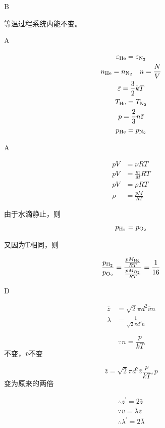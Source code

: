 \documentclass[b5paper,opensource]{./template/qyxf-book}
\begin{document}
B

\solve 等温过程系统内能不变。

A

\solve

\begin{gather*}
\varepsilon_{\ce{He}}=\varepsilon_{\ce{N2}}\\
n_{\ce{He}}=n_{\ce{N2}}\quad n=\frac{N}{V}\\
\bar{\varepsilon}=\frac{3}{2}kT\\
T_{\ce{He}}=T_{\ce{N2}}\\
p=\frac{2}{3}n\bar{\varepsilon}\\
p_{\ce{He}}=p_{\ce{N2}}
\end{gather*}

A

\solve

$$
\begin{aligned} 
p V & = \nu R T \\ p V & = \frac { m } { M } R T \\
p V & = \rho R T \\
\rho & = \frac { p M } { R T }
\end{aligned}
$$

由于水滴静止，则
$$
p_{\ce{H2}} =p_{\ce{O2}}
$$

又因为T相同，则

$$
\frac { p _ {\ce{H2}} } { p _ {\ce{O2}} } = \frac { \frac { p M _ {\ce{H2}} } { R T } } { \frac { p M_{\ce{O2}}}{ R T}}=\frac{1}{16}
$$

D

\solve

$$
\begin{aligned}
 \bar { z } & = \sqrt { 2 } \pi d ^ { 2 } \bar { v } n \\ \lambda & = \frac { 1 } { \sqrt { 2 } \pi d ^ { 2 } n } 
\end{aligned}
$$

$$
\because n = \frac { p } { k T }
$$不变，$ \bar { v }$不变

$$
\bar { z } = \sqrt { 2 } \pi d ^ { 2 } \bar { v } \frac { p } { k T },p
$$变为原来的两倍

$$
\begin{array} { l } 
{ \therefore z ^ { \prime } = 2 \bar { z } } \\ 
{ \because \bar { v } = \bar { \lambda } \bar { z } } \\
 { \therefore \lambda ^ { \prime } = 2 \bar { \lambda } }
\end{array}
$$
\end{document}
